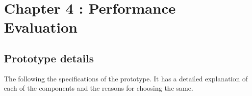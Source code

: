 \documentclass{article}
\begin{document}





\section{Chapter 4 : Performance Evaluation}
\subsection{Prototype details}
The following the specifications of the prototype. It has a detailed explanation of each of the components and the reasons for choosing the same.
\end{document}
